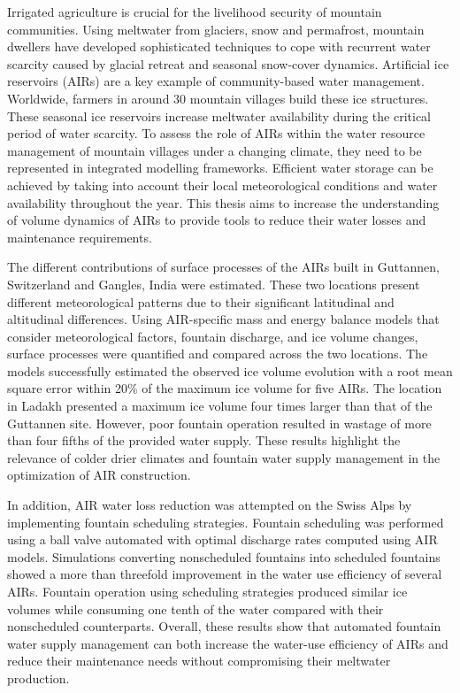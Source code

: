 \label{sec:summary}

Irrigated agriculture is crucial for the livelihood security of mountain communities. Using meltwater from
glaciers, snow and permafrost, mountain dwellers have developed sophisticated techniques to cope with recurrent
water scarcity caused by glacial retreat and seasonal snow-cover dynamics. Artificial ice reservoirs (AIRs) are
a key example of community-based water management. Worldwide, farmers in around 30 mountain villages build these
ice structures. These seasonal ice reservoirs increase meltwater availability during the critical period of
water scarcity. To assess the role of AIRs within the water resource management of mountain villages under a
changing climate, they need to be represented in integrated modelling frameworks. Efficient water storage can be
achieved by taking into account their local meteorological conditions and water availability throughout the
year. This thesis aims to increase the understanding of volume dynamics of AIRs to provide tools to reduce their
water losses and maintenance requirements.

The different contributions of surface processes of the AIRs built in Guttannen, Switzerland and  Gangles, India
were estimated. These two locations present different meteorological patterns due to their significant
latitudinal and altitudinal differences. Using AIR-specific mass and energy balance models that consider
meteorological factors, fountain discharge, and ice volume changes, surface processes were quantified and
compared across the two locations. The models successfully estimated the observed ice volume evolution with a
root mean square error within 20\% of the maximum ice volume for five AIRs. The location in Ladakh presented a
maximum ice volume four times larger than that of the Guttannen site. However, poor fountain operation resulted
in wastage of more than four fifths of the provided water supply. These results highlight the relevance of
colder drier climates and fountain water supply management in the optimization of AIR construction.

In addition, AIR water loss reduction was attempted on the Swiss Alps by implementing fountain scheduling
strategies. Fountain scheduling was performed using a ball valve automated with optimal discharge rates computed
using AIR models. Simulations converting nonscheduled fountains into scheduled fountains showed a more than
threefold improvement in the water use efficiency of several AIRs. Fountain operation using scheduling
strategies produced similar ice volumes while consuming one tenth of the water compared with their nonscheduled
counterparts. Overall, these results show that automated fountain water supply management can both increase the
water-use efficiency of AIRs and reduce their maintenance needs without compromising their meltwater production.

